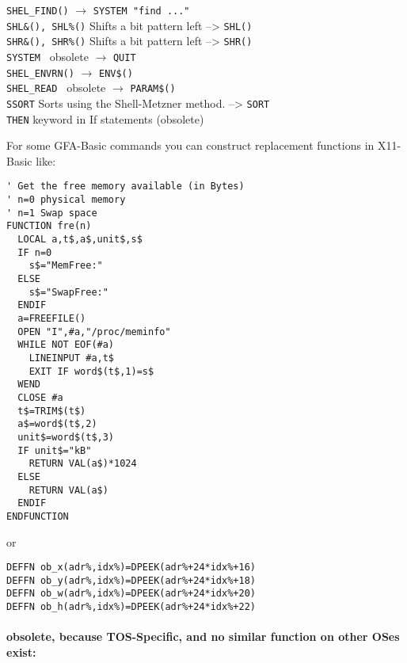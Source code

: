 \begin{tabbing}
\verb|SHEL_FIND()|\>    $\longrightarrow$ \verb|SYSTEM "find ..."|\\
\verb|SHL&(), SHL%()|\>  Shifts a bit pattern left --> \verb|SHL()|\\
\verb|SHR&(), SHR%()|\>  Shifts a bit pattern left --> \verb|SHR()|\\
\verb|SYSTEM |\> 	obsolete  $\longrightarrow$ \verb|QUIT|\\
\verb|SHEL_ENVRN()|\>	$\longrightarrow$ \verb|ENV$()|\\
\verb|SHEL_READ |\> 	obsolete  $\longrightarrow$ \verb|PARAM$()|\\
\verb|SSORT|\>        Sorts using the Shell-Metzner method. --> \verb|SORT|\\
\verb|THEN|\>           keyword in If statements (obsolete)\\
\end{tabbing}

For some GFA-Basic commands you can construct replacement functions in 
X11-Basic like:
\begin{mdframed}[hidealllines=true,backgroundcolor=blue!20]
\begin{verbatim}
' Get the free memory available (in Bytes)
' n=0 physical memory
' n=1 Swap space
FUNCTION fre(n)
  LOCAL a,t$,a$,unit$,s$
  IF n=0
    s$="MemFree:"
  ELSE 
    s$="SwapFree:"
  ENDIF
  a=FREEFILE()
  OPEN "I",#a,"/proc/meminfo"
  WHILE NOT EOF(#a)
    LINEINPUT #a,t$
    EXIT IF word$(t$,1)=s$
  WEND
  CLOSE #a
  t$=TRIM$(t$)
  a$=word$(t$,2)
  unit$=word$(t$,3)
  IF unit$="kB"
    RETURN VAL(a$)*1024
  ELSE
    RETURN VAL(a$)
  ENDIF
ENDFUNCTION
\end{verbatim}
\end{mdframed}
or 
\begin{mdframed}[hidealllines=true,backgroundcolor=blue!20]
\begin{verbatim}
DEFFN ob_x(adr%,idx%)=DPEEK(adr%+24*idx%+16)
DEFFN ob_y(adr%,idx%)=DPEEK(adr%+24*idx%+18)
DEFFN ob_w(adr%,idx%)=DPEEK(adr%+24*idx%+20)
DEFFN ob_h(adr%,idx%)=DPEEK(adr%+24*idx%+22)
\end{verbatim}
\end{mdframed}

\paragraph{obsolete, because TOS-Specific, and no similar function on other OSes exist:}


